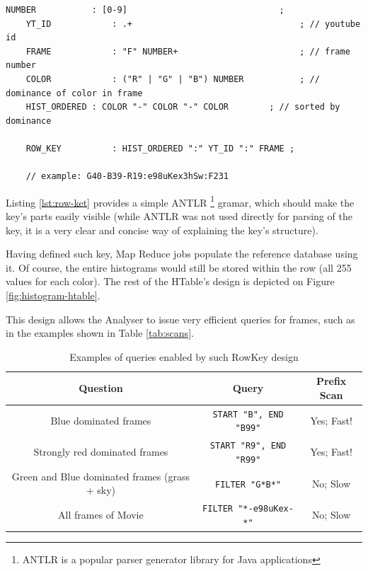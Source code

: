 \begin{lstlisting}[caption={Gramar for the Histogram RowKey. In essence, it contains an encoded color dominance value, the youtube id of the movie, and frame number.}, label={lst:row-key}]
    NUMBER           : [0-9]                              ;
    YT_ID            : .+                                 ; // youtube id
    FRAME            : "F" NUMBER+                        ; // frame number
    COLOR            : ("R" | "G" | "B") NUMBER           ; // dominance of color in frame
    HIST_ORDERED : COLOR "-" COLOR "-" COLOR        ; // sorted by dominance

    ROW_KEY          : HIST_ORDERED ":" YT_ID ":" FRAME ;
    
    // example: G40-B39-R19:e98uKex3hSw:F231
\end{lstlisting}

Listing \ref{lst:row-ket} provides a simple ANTLR \footnote{ANTLR is a popular parser generator library for Java applications} gramar, which should make the key's parts easily visible (while ANTLR was not used directly for parsing of the key, it is a very clear and concise way of explaining the key's structure).

Having defined such key, Map Reduce jobs populate the reference database using it. Of course, the entire histograms would still be stored within the row (all 255 values for each color). The rest of the HTable's design is depicted on Figure \ref{fig:histogram-htable}.

This design allows the Analyser to issue very efficient queries for frames, such as in the examples shown in Table \ref{tab:scans}.

\begin{table}[ch!]
  \centering
  \begin{tabular}{|c|c|c|}
  \hline
  \textbf{Question}                  & \textbf{Query}                    & Prefix Scan \\ \hline
  Blue dominated frames              & \verb|START "B", END "B99"|       & Yes; Fast! \\ \hline
  Strongly red dominated frames      & \verb|START "R9", END "R99"|      & Yes; Fast! \\ \hline
  Green and Blue dominated frames (grass + sky) & \verb|FILTER "G*B*"|   & No; Slow \\ \hline
  All frames of Movie                & \verb|FILTER "*-e98uKex-*"|       & No; Slow \\ \hline
  \end{tabular}
  \caption{Examples of queries enabled by such RowKey design}
\end{table}


